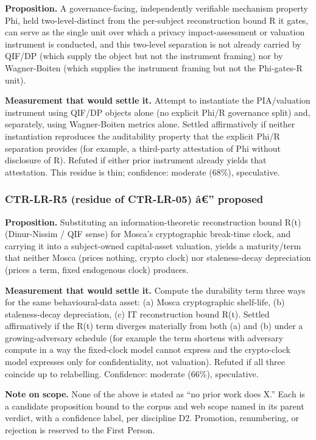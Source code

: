 \documentclass[
  11pt,
]{article}
\begin{document}
\textbf{Proposition.} A governance-facing, independently verifiable
mechanism property Phi, held two-level-distinct from the per-subject
reconstruction bound R it gates, can serve as the single unit over which
a privacy impact-assessment or valuation instrument is conducted, and
this two-level separation is not already carried by QIF/DP (which supply
the object but not the instrument framing) nor by Wagner-Boiten (which
supplies the instrument framing but not the Phi-gates-R unit).

\textbf{Measurement that would settle it.} Attempt to instantiate the
PIA/valuation instrument using QIF/DP objects alone (no explicit Phi/R
governance split) and, separately, using Wagner-Boiten metrics alone.
Settled affirmatively if neither instantiation reproduces the
auditability property that the explicit Phi/R separation provides (for
example, a third-party attestation of Phi without disclosure of R).
Refuted if either prior instrument already yields that attestation. This
residue is thin; confidence: moderate (68\%), speculative.

\subsubsection{CTR-LR-R5 (residue of CTR-LR-05) â€''
proposed}\label{ctr-lr-r5-residue-of-ctr-lr-05-uxe2-proposed}

\textbf{Proposition.} Substituting an information-theoretic
reconstruction bound R(t) (Dinur-Nissim / QIF sense) for Mosca's
cryptographic break-time clock, and carrying it into a subject-owned
capital-asset valuation, yields a maturity/term that neither Mosca
(prices nothing, crypto clock) nor staleness-decay depreciation (prices
a term, fixed endogenous clock) produces.

\textbf{Measurement that would settle it.} Compute the durability term
three ways for the same behavioural-data asset: (a) Mosca cryptographic
shelf-life, (b) staleness-decay depreciation, (c) IT reconstruction
bound R(t). Settled affirmatively if the R(t) term diverges materially
from both (a) and (b) under a growing-adversary schedule (for example
the term shortens with adversary compute in a way the fixed-clock model
cannot express and the crypto-clock model expresses only for
confidentiality, not valuation). Refuted if all three coincide up to
relabelling. Confidence: moderate (66\%), speculative.

\textbf{Note on scope.} None of the above is stated as ``no prior work
does X.'' Each is a candidate proposition bound to the corpus and web
scope named in its parent verdict, with a confidence label, per
discipline D2. Promotion, renumbering, or rejection is reserved to the
First Person.
\end{document}
